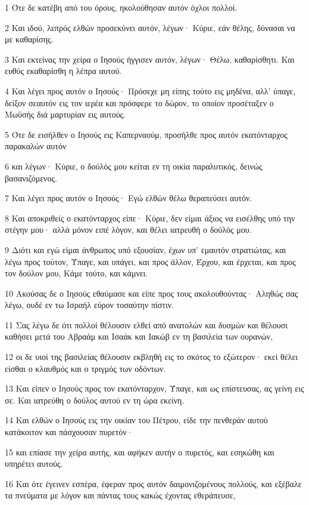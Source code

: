 \par 1 Ότε δε κατέβη από του όρους, ηκολούθησαν αυτόν όχλοι πολλοί.
\par 2 Και ιδού, λεπρός ελθών προσεκύνει αυτόν, λέγων· Κύριε, εάν θέλης, δύνασαι να με καθαρίσης.
\par 3 Και εκτείνας την χείρα ο Ιησούς ήγγισεν αυτόν, λέγων· Θέλω, καθαρίσθητι. Και ευθύς εκαθαρίσθη η λέπρα αυτού.
\par 4 Και λέγει προς αυτόν ο Ιησούς· Πρόσεχε μη είπης τούτο εις μηδένα, αλλ' ύπαγε, δείξον σεαυτόν εις τον ιερέα και πρόσφερε το δώρον, το οποίον προσέταξεν ο Μωϋσής διά μαρτυρίαν εις αυτούς.
\par 5 Ότε δε εισήλθεν ο Ιησούς εις Καπερναούμ, προσήλθε προς αυτόν εκατόνταρχος παρακαλών αυτόν
\par 6 και λέγων· Κύριε, ο δούλός μου κείται εν τη οικία παραλυτικός, δεινώς βασανιζόμενος.
\par 7 Και λέγει προς αυτόν ο Ιησούς· Εγώ ελθών θέλω θεραπεύσει αυτόν.
\par 8 Και αποκριθείς ο εκατόνταρχος είπε· Κύριε, δεν είμαι άξιος να εισέλθης υπό την στέγην μου· αλλά μόνον ειπέ λόγον, και θέλει ιατρευθή ο δούλός μου.
\par 9 Διότι και εγώ είμαι άνθρωπος υπό εξουσίαν, έχων υπ' εμαυτόν στρατιώτας, και λέγω προς τούτον, Ύπαγε, και υπάγει, και προς άλλον, Έρχου, και έρχεται, και προς τον δούλον μου, Κάμε τούτο, και κάμνει.
\par 10 Ακούσας δε ο Ιησούς εθαύμασε και είπε προς τους ακολουθούντας· Αληθώς σας λέγω, ουδέ εν τω Ισραήλ εύρον τοσαύτην πίστιν.
\par 11 Σας λέγω δε ότι πολλοί θέλουσιν ελθεί από ανατολών και δυσμών και θέλουσι καθήσει μετά του Αβραάμ και Ισαάκ και Ιακώβ εν τη βασιλεία των ουρανών,
\par 12 οι δε υιοί της βασιλείας θέλουσιν εκβληθή εις το σκότος το εξώτερον· εκεί θέλει είσθαι ο κλαυθμός και ο τριγμός των οδόντων.
\par 13 Και είπεν ο Ιησούς προς τον εκατόνταρχον, Ύπαγε, και ως επίστευσας, ας γείνη εις σε. Και ιατρεύθη ο δούλος αυτού εν τη ώρα εκείνη.
\par 14 Και ελθών ο Ιησούς εις την οικίαν του Πέτρου, είδε την πενθεράν αυτού κατάκοιτον και πάσχουσαν πυρετόν·
\par 15 και επίασε την χείρα αυτής, και αφήκεν αυτήν ο πυρετός, και εσηκώθη και υπηρέτει αυτούς.
\par 16 Και ότε έγεινεν εσπέρα, έφεραν προς αυτόν δαιμονιζομένους πολλούς, και εξέβαλε τα πνεύματα με λόγον και πάντας τους κακώς έχοντας εθεράπευσε,
